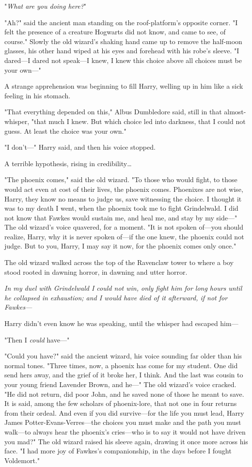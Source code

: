 "\emph{What are you doing here?}"

"Ah?" said the ancient man standing on the roof-platform's opposite corner. "I
felt the presence of a creature Hogwarts did not know, and came to see, of
course." Slowly the old wizard's shaking hand came up to remove the half-moon
glasses, his other hand wiped at his eyes and forehead with his robe's sleeve.
"I dared---I dared not speak---I knew, I knew this choice above all choices
must be your own---"

A strange apprehension was beginning to fill Harry, welling up in him like a
sick feeling in his stomach.

"That everything depended on this," Albus Dumbledore said, still in that
almost-whisper, "that much I knew. But which choice led into darkness, that I
could not guess. At least the choice was your own."

"I don't---" Harry said, and then his voice stopped.

A terrible hypothesis, rising in credibility{\ldots}

"The phoenix comes," said the old wizard. "To those who would fight, to those
would act even at cost of their lives, the phoenix comes. Phoenixes are not
wise, Harry, they know no means to judge us, save witnessing the choice. I
thought it was to my death I went, when the phoenix took me to fight
Grindelwald. I did not know that Fawkes would sustain me, and heal me, and stay
by my side---" The old wizard's voice quavered, for a moment. "It is not spoken
of---you should realize, Harry, why it is never spoken of---if the one knew,
the phoenix could not judge. But to you, Harry, I may say it now, for the
phoenix comes only once."

The old wizard walked across the top of the Ravenclaw tower to where a boy
stood rooted in dawning horror, in dawning and utter horror.

\emph{In my duel with Grindelwald I could not win, only fight him for long
hours until he collapsed in exhaustion; and I would have died of it afterward,
if not for Fawkes---}

Harry didn't even know he was speaking, until the whisper had escaped him---

"Then I \emph{could} have---"

"Could you have?" said the ancient wizard, his voice sounding far older than
his normal tones. "Three times, now, a phoenix has come for my student. One did
send hers away, and the grief of it broke her, I think. And the last was cousin
to your young friend Lavender Brown, and he---" The old wizard's voice cracked.
"He did not return, did poor John, and he saved none of those he meant to save.
It is said, among the few scholars of phoenix-lore, that not one in four
returns from their ordeal. And even if you did survive---for the life you must
lead, Harry James Potter-Evans-Verres---the choices you must make and the path
you must walk---to always hear the phoenix's cries---who is to say it would not
have driven you mad?" The old wizard raised his sleeve again, drawing it once
more across his face. "I had more joy of Fawkes's companionship, in the days
before I fought Voldemort."

